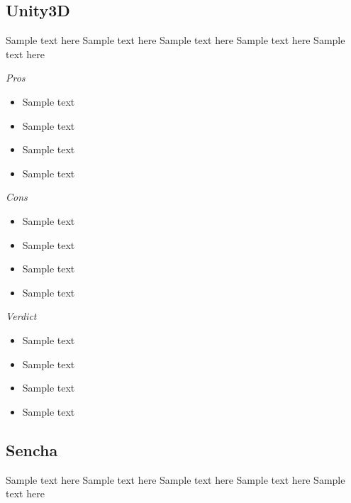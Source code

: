 \documentclass[11pt]{article}
\begin{document}
\subsection{Unity3D}

Sample text here
Sample text here
Sample text here
Sample text here
Sample text here \par

\emph{Pros}
\begin{itemize}
  \setlength{\itemsep}{0mm}  
  \item Sample text
  \item Sample text
  \item Sample text
  \item Sample text
\end{itemize}
\par
\emph{Cons}
\begin{itemize}
  \setlength{\itemsep}{0mm}  
  \item Sample text
  \item Sample text
  \item Sample text
  \item Sample text
\end{itemize}
\par
\emph{Verdict}
\begin{itemize}
  \setlength{\itemsep}{0mm}  
  \item Sample text
  \item Sample text
  \item Sample text
  \item Sample text
\end{itemize}


\subsection{Sencha}

Sample text here
Sample text here
Sample text here
Sample text here
Sample text here \par
\end{document}
